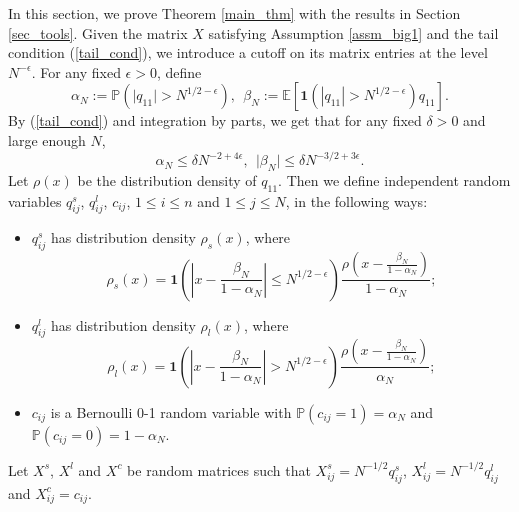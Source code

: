 In this section, we prove Theorem \ref{main_thm} with the results in Section \ref{sec_tools}. 
Given the matrix $X$ satisfying Assumption \ref{assm_big1} and the tail condition (\ref{tail_cond}), we introduce a cutoff on its matrix entries at the level $N^{-\epsilon}$. For any fixed $\epsilon>0$, define
\begin{equation*}
\alpha_N:=\mathbb{P}\left(\vert q_{11} \vert > N^{{1}/{2}-\epsilon}\right), \ \ \beta_N:=\mathbb{E}\left[\mathbf{1}{\left(|q_{11}|> N^{{1}/{2}-\epsilon}\right)}q_{11} \right].
\end{equation*}
By (\ref{tail_cond}) and integration by parts, we get that for any fixed $\delta>0$ and large enough $N$,
\begin{equation}
\alpha_N \leq \delta N^{-2+4\epsilon}, \ \ \vert \beta_N \vert \leq \delta N^{-{3}/{2}+3 \epsilon} . \label{BBBOUNDS}
\end{equation}
Let $\rho(x)$ be the distribution density of $q_{11}$. Then we define independent random variables $q_{ij}^s$, $q_{ij}^l$, $c_{ij}$, $1\le i \le n$ and $1\le j \le N$, in the following ways:
\begin{itemize}
\item $q_{ij}^s$ has distribution density $\rho_s(x)$, where
\begin{equation}
\rho_s(x)= \mathbf{1}\left(\left| x-\frac{\beta_N}{1-\alpha_N}  \right| \leq N^{{1}/{2}-\epsilon} \right) \frac{\rho\left(x-\frac{\beta_N}{1-\alpha_N}\right)}{1-\alpha_N}; \nonumber%
\end{equation}
\item $q_{ij}^l$ has distribution density $\rho_l(x)$, where
\begin{equation}
\rho_l(x)= \mathbf{1}\left(\left| x-\frac{\beta_N}{1-\alpha_N}  \right| > N^{{1}/{2}-\epsilon} \right)\frac{\rho\left(x-\frac{\beta_N}{1-\alpha_N}\right)}{\alpha_N}; \nonumber%
\end{equation}
\item $c_{ij}$ is a Bernoulli 0-1 random variable with $\mathbb{P}(c_{ij}=1)=\alpha_N$ and $\mathbb{P}(c_{ij}=0)=1-\alpha_N$.
\end{itemize}
Let $X^s$, $X^l$ and $X^c$ be random matrices such that $X^s_{ij} = N^{-1/2}q_{ij}^s$, $X^l_{ij} = N^{-1/2}q_{ij}^l$ and $X^c_{ij} = c_{ij}$.
